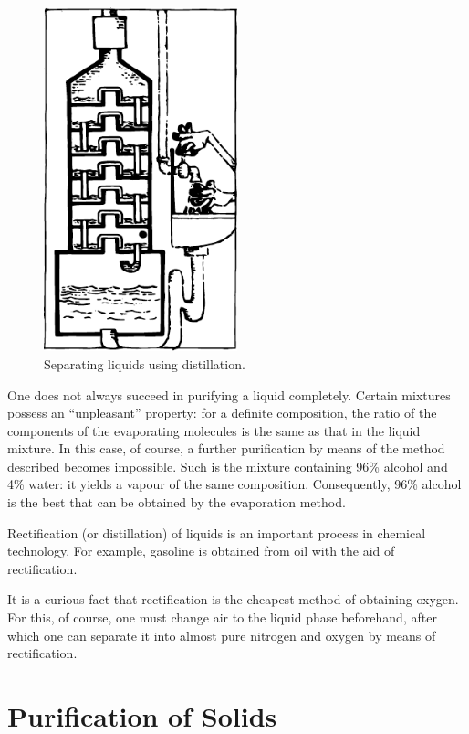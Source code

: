 \begin{figure}[!ht]
\centering
\includegraphics[width=0.5\textwidth]{figures/fig-05-01.pdf}
\caption{Separating liquids using distillation.}
\label{fig-5.1}
\end{figure}

One does not always succeed in purifying a liquid com­pletely. Certain mixtures possess an ``unpleasant'' prop­erty: for a definite composition, the ratio of the compo­nents of the evaporating molecules is the same as that in the liquid mixture. In this case, of course, a further pu­rification by means of the method described becomes im­possible. Such is the mixture containing 96\% alcohol and 4\% water: it yields a vapour of the same composition. Consequently, 96\% alcohol is the best that can be ob­tained by the evaporation method.

Rectification (or distillation) of liquids is an important process in chemical technology. For example, gasoline is obtained from oil with the aid of rectification.

It is a curious fact that rectification is the cheapest method of obtaining oxygen. For this, of course, one must change air to the liquid phase beforehand, after which one can separate it into almost pure nitrogen and oxygen by means of rectification.

\section{Purification of Solids}

